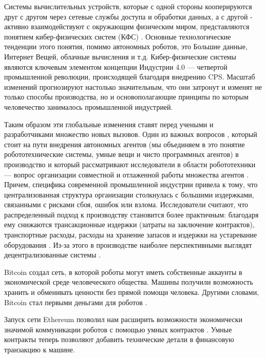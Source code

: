 \documentclass{article}
\begin{document}
Системы вычислительных устройств, которые с одной стороны кооперируются друг с другом через сетевые службы доступа и обработки данных, а с другой - активно взаимодействуют с окружающим физическим миром, представляются понятием кибер-физических систем (КФС) \cite{Kang2016SmartDirections}. Основные технологические тенденции этого понятия, помимо автономных роботов, это Большие данные, Интернет Вещей, облачные вычисления и т.д. Кибер-физические системы являются ключевым элементом концепции  Индустрии 4.0 \cite{Jazdi2014Cyber4.0} — четвертой промышленной революции, происходящей благодаря внедрению CPS. Масштаб изменений прогнозируют настолько значительным, что они затронут и изменят \cite{Monostori2014Cyber-physicalChallenges} не только способы производства, но и основополагающие принципы по которым человечество занималось промышленной индустрией.

Таким образом эти глобальные изменения ставят перед учеными и разработчиками множество новых вызовов. Один из важных вопросов \cite{Leitao2015IndustrialIndustry}, который стоит на пути внедрения автономных агентов (мы объединяем в это понятие робототехнические системы, умные вещи и чисто программных агентов) в производство и который рассматривают \cite{Zhu2014RobustSystems} исследователи в области робототехники — вопрос организации совместной и отлаженной работы множества агентов \cite{Liu2013Multi-robotConstraints}. Причем, специфика \cite{Lasi2014Industry4.0} современной промышленной индустрии привела к тому, что централизованная структура организации столкнулась с большими издержками, связанными с рисками сбоя, ошибок или взлома. Исследователи считают, что распределенный подход к производству становится более практичным: благодаря ему снижаются трансакционные издержки (затраты на заключение контрактов), транспортные расходы, расходы на хранение запасов и издержки на устаревание оборудования \cite{Khajavi2014AdditiveChain}. Из-за этого в производстве наиболее перспективными выглядят децентрализованные системы \cite{DeGennaro2006DecentralizedSystems}. 

Bitcoin создал сеть, в которой роботы могут иметь собственные аккаунты в экономической среде человеческого общества. Машины получили возможность хранить и обменивать ценности без прямой помощи человека. Другими словами, Bitcoin стал первыми деньгами для роботов \cite{Kelion2015CouldThemselves}.

Запуск сети Ethereum позволил нам расширить возможности экономически значимой коммуникации роботов с помощью умных контрактов \cite{Buterin2014EthereumPlatform}. Умные контракты теперь позволяют добавить технические детали в финансовую транзакцию к машине. 
\end{document}
